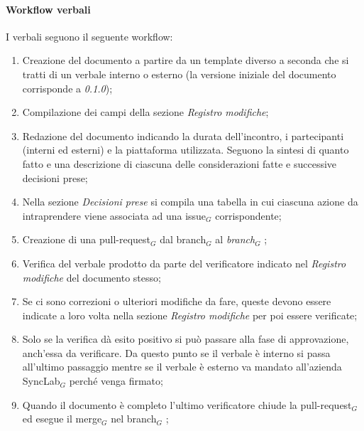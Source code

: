     \paragraph{Workflow verbali}
    I verbali seguono il seguente workflow:
    \begin{enumerate}
        \item Creazione del documento a partire da un template diverso a seconda che si tratti di un verbale interno o esterno (la versione iniziale del documento corrisponde a \textit{0.1.0});
        \item Compilazione dei campi della sezione \textit{Registro modifiche};
        \item Redazione del documento indicando la durata dell'incontro, i partecipanti (interni ed esterni) e la piattaforma utilizzata. Seguono la sintesi di quanto fatto e una descrizione di ciascuna 
        delle considerazioni fatte e successive decisioni prese;
        \item Nella sezione \textit{Decisioni prese} si compila una 
        tabella in cui ciascuna azione da intraprendere viene associata 
        ad una issue$_G$ corrispondente;
        \item Creazione di una pull-request$_G$ dal branch$_G$  al \textit{branch}$_G$ ;
        \item Verifica del verbale prodotto da parte del verificatore 
        indicato nel \textit{Registro modifiche} del documento stesso;
        \item Se ci sono correzioni o ulteriori modifiche da fare, queste 
        devono essere indicate a loro volta nella sezione \textit{Registro modifiche} per poi essere verificate;
        \item Solo se la verifica dà esito positivo si può passare alla fase di approvazione, anch'essa da verificare. \newline Da questo punto se il verbale è interno si passa all'ultimo passaggio mentre se il verbale è esterno va mandato all'azienda SyncLab$_G$ perché venga firmato;
        \item Quando il documento è completo l'ultimo verificatore 
        chiude la pull-request$_G$ ed esegue il merge$_G$ nel branch$_G$ ;
    \end{enumerate}

